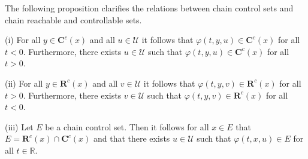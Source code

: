 \documentclass{siamltex}%
\begin{document}
The following proposition clarifies the relations between chain control sets
and chain reachable and controllable sets.

\begin{theorem}
\label{Theorem_control_inv}(i) For all $y\in\mathbf{C}^{c}(x)$ and all
$u\in\mathcal{U}$ it follows that $\varphi(t,y,u)\in\mathbf{C}^{c}(x)$ for all
$t<0$. Furthermore, there exists $u\in\mathcal{U}$ such that $\varphi
(t,y,u)\in\mathbf{C}^{c}(x)$ for all $t>0$.

(ii) For all $y\in\mathbf{R}^{c}(x)$ and all $v\in\mathcal{U}$ it follows that
$\varphi(t,y,v)\in\mathbf{R}^{c}(x)$ for all $t>0$. Furthermore, there exists
$v\in\mathcal{U}$ such that $\varphi(t,y,v)\in\mathbf{R}^{c}(x)$ for all $t<0$.

(iii) Let $E$ be a chain control set. Then it follows for all $x\in E$ that
$E=\mathbf{R}^{c}(x)\cap\mathbf{C}^{c}(x)$ and that there exists
$u\in\mathcal{U}$ such that $\varphi(t,x,u)\in E$ for all $t\in\mathbb{R}$.
\end{theorem}
\end{document}
